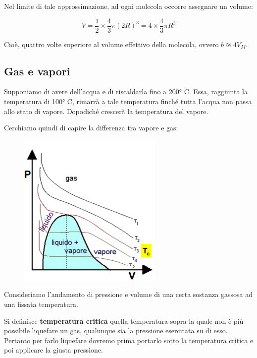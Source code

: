 \vspace{0.2cm}Nel limite di tale approssimazione, ad ogni molecola occorre assegnare un volume:

$$V = \frac{1}{2} \times \frac{4}{3}\pi (2R)^3 = 4 \times \frac{4}{3}\pi R^3$$

Cioè, quattro volte superiore al volume effettivo della molecola, ovvero $b \approxeq 4V_M$.
\subsection{Gas e vapori}
Supponiamo di avere dell'acqua e di riscaldarla fino a 200° C. Essa, raggiunta la temperatura di 100° C, rimarrà a tale temperatura finché tutta l'acqua non passa allo stato di vapore. Dopodiché crescerà la temperatura del vapore.

Cerchiamo quindi di capire la differenza tra vapore e gas:

\vspace{-0.4cm}

\hspace{1cm}\begin{minipage}{0.53 \textwidth}
    \begin{figure}[H]
        \includegraphics[width=7cm]{immagini/grafico_pV.png}
    \end{figure}
\end{minipage}
\begin{minipage}{0.4 \textwidth}
\vspace{0.6cm}Consideriamo l'andamento di pressione e volume di una certa sostanza gassosa ad una fissata temperatura.

\vspace{0.2cm}Si definisce \textbf{temperatura critica} quella temperatura sopra la quale non è più possibile liquefare un gas, qualunque sia la pressione esercitata su di esso. Pertanto per farlo liquefare dovremo prima portarlo sotto la temperatura critica e poi applicare la giusta pressione.
\end{minipage}

